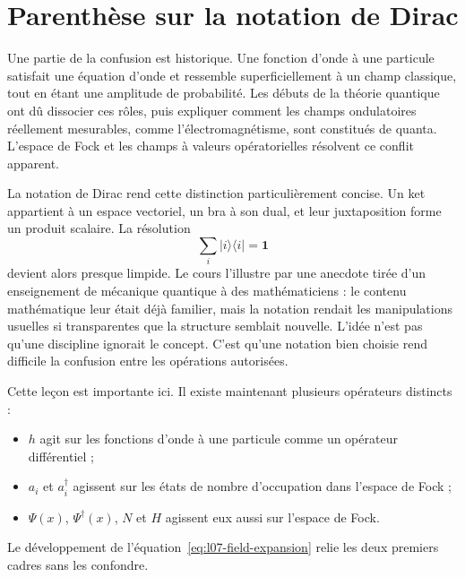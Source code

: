 \section{Parenthèse sur la notation de Dirac}

Une partie de la confusion est historique. Une fonction d’onde à une particule satisfait une équation d’onde et ressemble superficiellement à un champ classique, tout en étant une amplitude de probabilité. Les débuts de la théorie quantique ont dû dissocier ces rôles, puis expliquer comment les champs ondulatoires réellement mesurables, comme l’électromagnétisme, sont constitués de quanta. L’espace de Fock et les champs à valeurs opératorielles résolvent ce conflit apparent.

La notation de Dirac rend cette distinction particulièrement concise. Un ket appartient à un espace vectoriel, un bra à son dual, et leur juxtaposition forme un produit scalaire. La résolution
\begin{equation}
\sum_i|i\rangle\langle i|=\mathbf 1
\end{equation}
devient alors presque limpide. Le cours l’illustre par une anecdote tirée d’un enseignement de mécanique quantique à des mathématiciens : le contenu mathématique leur était déjà familier, mais la notation rendait les manipulations usuelles si transparentes que la structure semblait nouvelle. L’idée n’est pas qu’une discipline ignorait le concept. C’est qu’une notation bien choisie rend difficile la confusion entre les opérations autorisées.

Cette leçon est importante ici. Il existe maintenant plusieurs opérateurs distincts :
\begin{itemize}
\item \(h\) agit sur les fonctions d’onde à une particule comme un opérateur différentiel ;
\item \(a_i\) et \(a_i^\dagger\) agissent sur les états de nombre d’occupation dans l’espace de Fock ;
\item \(\Psi(x)\), \(\Psi^\dagger(x)\), \(N\) et \(H\) agissent eux aussi sur l’espace de Fock.
\end{itemize}
Le développement de l’équation~\eqref{eq:l07-field-expansion} relie les deux premiers cadres sans les confondre.

\begin{classroomqa}
\end{classroomqa}

